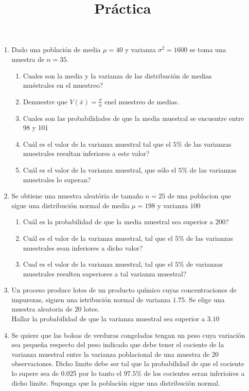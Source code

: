 \documentclass{article}
\title{Práctica}
\begin{document}
\maketitle

\begin{enumerate}
    \item Dado una población de media $\mu=40$ y varianza ${\sigma}^2=1600$ se toma una muestra de $n=35$.

    \begin{enumerate}
        \item Cuales son la media y la varianza de las distribución de medias muéstrales en el muestreo?
        
        \item Demuestre que $V(\bar{x})=\frac{\sigma}{n}$ enel muestreo de medias.
        
        \item Cuales son las probabilidades de que la media muestral se encuentre entre 98 y 101
        
        \item Cuál es el valor de la varianza muestral tal que el $5\%$ de las varianzas muestrales resultan inferiores a este valor?
        
        \item Cuál es el valor de la varianza muestral, que sólo el $5\%$ de las varianzas muestrales lo superan?
        \end{enumerate}    
    \item Se obtiene una muestra aleatória de tamaño $n=25$ de una poblacion que sigue una distribución normal de media $\mu=198$ y varianza $100$
    \begin{enumerate}
        \item Cuál es la probabilidad de que la media muestral sea superior a 200?
        \item Cuál es el valor de la varianza muestral, tal que el $5\%$ de las varianzas muestrales sean inferiores a dicho valor?
        \item Cual es el valor de la varianza muestral, tal que el $5\%$ de varianzas muestrales resulten superiores a tal varianza muestral?
        \end{enumerate}
        
    
    \item Un proceso produce lotes de un producto químico cuyas concentraciones de impurezas, siguen una istribución normal de varianza $1.75$. Se elige una muestra aleatoria de $20$ lotes.\\
        Hallar la probabilidad de que la varianza muestral sea superior a $3.10$
    \item Se quiere que las bolsas de verduras congeladas tengan un peso cuya variación sea pequeña respecto del peso indicado que debe tener el cociente de la varianza muestral entre la varianza poblacional de una muestra de 20 observaciones. Dicho limite debe ser tal que la probabilidad de que el cociente lo supere sea de 0.025 por lo tanto el $97.5\%$ de los cocientes seran inferioires a dicho limite. Suponga que la población sigue una distribución normal.
    


\end{enumerate}
\end{document}
